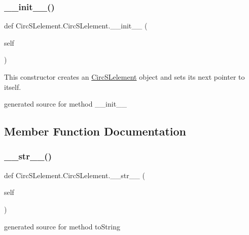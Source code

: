 \subsubsection{\texorpdfstring{\+\_\+\+\_\+init\+\_\+\+\_\+()}{\_\_init\_\_()}}
{\footnotesize\ttfamily def Circ\+S\+Lelement.\+Circ\+S\+Lelement.\+\_\+\+\_\+init\+\_\+\+\_\+ (\begin{DoxyParamCaption}\item[{}]{self }\end{DoxyParamCaption})}



This constructor creates an \hyperlink{class_circ_s_lelement_1_1_circ_s_lelement}{Circ\+S\+Lelement} object and sets its next pointer to itself. 

\begin{DoxyVerb}generated source for method __init__ \end{DoxyVerb}
 

\subsection{Member Function Documentation}
\hypertarget{class_circ_s_lelement_1_1_circ_s_lelement_ae75eb1b91bebd77b39fdb2c3345ded4b}{}\label{class_circ_s_lelement_1_1_circ_s_lelement_ae75eb1b91bebd77b39fdb2c3345ded4b} 
\subsubsection{\texorpdfstring{\+\_\+\+\_\+str\+\_\+\+\_\+()}{\_\_str\_\_()}}
{\footnotesize\ttfamily def Circ\+S\+Lelement.\+Circ\+S\+Lelement.\+\_\+\+\_\+str\+\_\+\+\_\+ (\begin{DoxyParamCaption}\item[{}]{self }\end{DoxyParamCaption})}

\begin{DoxyVerb}generated source for method toString \end{DoxyVerb}
 \hypertarget{class_circ_s_lelement_1_1_circ_s_lelement_aaf95c45ae15b141a085bfb49b072540b}{}\label{class_circ_s_lelement_1_1_circ_s_lelement_aaf95c45ae15b141a085bfb49b072540b} 
